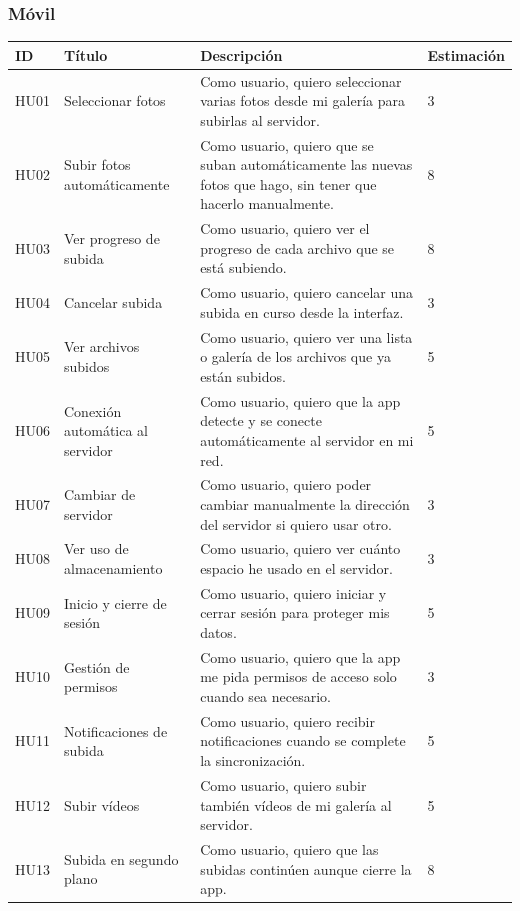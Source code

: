 \subsubsection{Móvil} 
\begin{tabularx}{\textwidth}{|l|l|>{\raggedright\arraybackslash}X|p{2cm}|}
    \hline
    ID & Título & Descripción & Estimación \\
    \hline
    HU01 & Seleccionar fotos & Como usuario, quiero seleccionar varias fotos desde mi galería para subirlas al servidor. & 3 \\
    \hline
    HU02 & Subir fotos automáticamente & Como usuario, quiero que se suban automáticamente las nuevas fotos que hago, sin tener que hacerlo manualmente. & 8 \\
    \hline
    HU03 & Ver progreso de subida & Como usuario, quiero ver el progreso de cada archivo que se está subiendo. & 8 \\
    \hline
    HU04 & Cancelar subida & Como usuario, quiero cancelar una subida en curso desde la interfaz. & 3 \\
    \hline
    HU05 & Ver archivos subidos & Como usuario, quiero ver una lista o galería de los archivos que ya están subidos. & 5 \\
    \hline
    HU06 & Conexión automática al servidor & Como usuario, quiero que la app detecte y se conecte automáticamente al servidor en mi red. & 5 \\
    \hline
    HU07 & Cambiar de servidor & Como usuario, quiero poder cambiar manualmente la dirección del servidor si quiero usar otro. & 3 \\
    \hline
    HU08 & Ver uso de almacenamiento & Como usuario, quiero ver cuánto espacio he usado en el servidor. & 3 \\
    \hline
    HU09 & Inicio y cierre de sesión & Como usuario, quiero iniciar y cerrar sesión para proteger mis datos. & 5 \\
    \hline
    HU10 & Gestión de permisos & Como usuario, quiero que la app me pida permisos de acceso solo cuando sea necesario. & 3 \\
    \hline
    HU11 & Notificaciones de subida & Como usuario, quiero recibir notificaciones cuando se complete la sincronización. & 5 \\
    \hline
    HU12 & Subir vídeos & Como usuario, quiero subir también vídeos de mi galería al servidor. & 5 \\
    \hline
    HU13 & Subida en segundo plano & Como usuario, quiero que las subidas continúen aunque cierre la app. & 8 \\

\end{tabularx}
